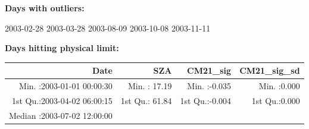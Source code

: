 \documentclass[
  10pt,
  a4paper,oneside]{article}
\begin{document}
\normalsize

\textbf{Days with outliers:}

2003-02-28 2003-03-28 2003-08-09 2003-10-08 2003-11-11

\textbf{Days hitting physical limit:}

\footnotesize

\begin{longtable}[]{@{}rrrr@{}}
\toprule
\begin{minipage}[b]{0.33\columnwidth}\raggedleft
Date\strut
\end{minipage} & \begin{minipage}[b]{0.19\columnwidth}\raggedleft
SZA\strut
\end{minipage} & \begin{minipage}[b]{0.19\columnwidth}\raggedleft
CM21\_sig\strut
\end{minipage} & \begin{minipage}[b]{0.19\columnwidth}\raggedleft
CM21\_sig\_sd\strut
\end{minipage}\tabularnewline
\midrule
\endhead
\begin{minipage}[t]{0.33\columnwidth}\raggedleft
Min. :2003-01-01 00:00:30\strut
\end{minipage} & \begin{minipage}[t]{0.19\columnwidth}\raggedleft
Min. : 17.19\strut
\end{minipage} & \begin{minipage}[t]{0.19\columnwidth}\raggedleft
Min. :-0.035\strut
\end{minipage} & \begin{minipage}[t]{0.19\columnwidth}\raggedleft
Min. :0.000\strut
\end{minipage}\tabularnewline
\begin{minipage}[t]{0.33\columnwidth}\raggedleft
1st Qu.:2003-04-02 06:00:15\strut
\end{minipage} & \begin{minipage}[t]{0.19\columnwidth}\raggedleft
1st Qu.: 61.84\strut
\end{minipage} & \begin{minipage}[t]{0.19\columnwidth}\raggedleft
1st Qu.:-0.004\strut
\end{minipage} & \begin{minipage}[t]{0.19\columnwidth}\raggedleft
1st Qu.:0.000\strut
\end{minipage}\tabularnewline
\begin{minipage}[t]{0.33\columnwidth}\raggedleft
Median :2003-07-02 12:00:00\strut

\end{minipage}
\end{longtable}
\end{document}
